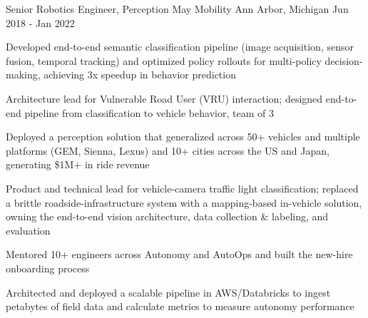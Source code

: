 \begin{cventries}
  \cventry
    {Senior Robotics Engineer, Perception} %
    {May Mobility} %
    {Ann Arbor, Michigan} %
    {Jun 2018 - Jan 2022} %
    {
      \begin{cvitems} %
        \item {Developed end-to-end semantic classification pipeline (image acquisition, sensor fusion, temporal tracking) and optimized policy rollouts for multi-policy decision-making, achieving 3x speedup in behavior prediction}
        \item {Architecture lead for Vulnerable Road User (VRU) interaction; designed end-to-end pipeline from classification to vehicle behavior, team of 3}
        \item {Deployed a perception solution that generalized across 50+ vehicles and multiple platforms (GEM, Sienna, Lexus) and 10+ cities across the US and Japan, generating \$1M+ in ride revenue}
        \item {Product and technical lead for vehicle-camera traffic light classification; replaced a brittle roadside-infrastructure system with a mapping-based in-vehicle solution, owning the end-to-end vision architecture, data collection \& labeling, and evaluation}
        \item {Mentored 10+ engineers across Autonomy and AutoOps and built the new-hire onboarding process}
        \item {Architected and deployed a scalable pipeline in AWS/Databricks to ingest petabytes of field data and calculate metrics to measure autonomy performance}
      \end{cvitems}
    }

\vspace{-4mm}

\end{cventries}
